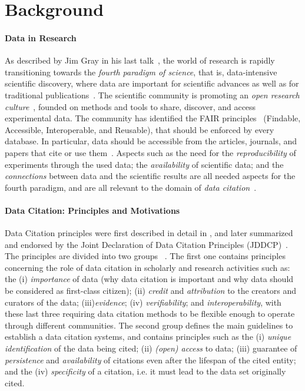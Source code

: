\section{Background}
\label{sec:related}

\paragraph{Data in Research} As described by Jim Gray in his last talk~\citep{hey2009jim}, the world of research is rapidly transitioning towards the \emph{fourth paradigm of science}, that is, data-intensive scientific discovery, where data are important for scientific advances as well as for traditional publications~\citep{Bechhofer2013linkisnotenough}.
The scientific community is promoting an \emph{open research culture}~\citep{nosek2015promoting}, founded on methods and tools to share, discover, and access experimental data. 
The community has identified the FAIR principles~\citep{fair2016Wilikinson} (Findable, Accessible, Interoperable, and Reusable), that should be enforced by every database. 
In particular, data should be accessible from the articles, journals, and papers that cite or use them~\citep{cousijn2019bringing}.
Aspects such as the need for the \emph{reproducibility} of experiments through the used data; the \emph{availability} of scientific data; and the \emph{connections} between data and the scientific results are all needed aspects for the fourth paradigm, and are all relevant to the domain of \emph{data citation}~\citep{honor2016data}.

\paragraph{Data Citation: Principles and Motivations} Data Citation principles were first described in detail in \citep{CODATA2013}, and later summarized and endorsed by the Joint Declaration of Data Citation Principles (JDDCP)~\citep{martone2014joint}. 
The principles are divided into two groups~ \citep{Silvello18jasist}. The first one contains principles concerning the role of data citation in scholarly and research activities such as: the (i) \emph{importance} of data (why data citation is important and why data should be considered as first-class citizen); (ii) \emph{credit} and \emph{attribution} to the creators and curators of the data; (iii)\emph{evidence}; (iv) \emph{verifiability}; and \emph{interoperability}, with these last three requiring data citation methods to be flexible enough to operate through different communities. 
The second group defines the main guidelines to establish a data citation systems, and contains principles such as the (i) \emph{unique identification} of the data being cited; (ii) \emph{(open) access} to data; (iii) guarantee of \emph{persistence} and \emph{availability} of citations even after the lifespan of the cited entity; and the (iv) \emph{specificity} of a citation, i.e. it must lead to the data set originally cited.

